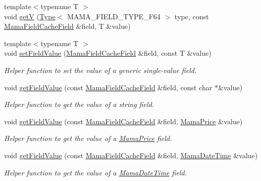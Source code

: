 \begin{DoxyCompactItemize}
\item 
{\footnotesize template$<$typename T $>$ }\\void \hyperlink{namespaceWombat_a3f1724eba9157b71bb956e9b5223c4d6}{getV} (\hyperlink{classWombat_1_1Type}{Type}$<$ MAMA\_\-FIELD\_\-TYPE\_\-F64 $>$ type, const \hyperlink{classWombat_1_1MamaFieldCacheField}{MamaFieldCacheField} \&field, T \&value)
\item 
{\footnotesize template$<$typename T $>$ }\\void \hyperlink{namespaceWombat_a94fa64d2a17b47d2a7b8aa81422ca29f}{setFieldValue} (\hyperlink{classWombat_1_1MamaFieldCacheField}{MamaFieldCacheField} \&field, const T \&value)
\begin{DoxyCompactList}\small\item\em Helper function to set the value of a generic single-\/value field. \item\end{DoxyCompactList}\item 
void \hyperlink{namespaceWombat_a1e9ea0e7b59e8d06e8e2a0ef9f93c45c}{getFieldValue} (const \hyperlink{classWombat_1_1MamaFieldCacheField}{MamaFieldCacheField} \&field, const char $\ast$\&value)
\begin{DoxyCompactList}\small\item\em Helper function to get the value of a string field. \item\end{DoxyCompactList}\item 
void \hyperlink{namespaceWombat_a021ef9dd6b39c33b35682320f76b7d32}{getFieldValue} (const \hyperlink{classWombat_1_1MamaFieldCacheField}{MamaFieldCacheField} \&field, \hyperlink{classWombat_1_1MamaPrice}{MamaPrice} \&value)
\begin{DoxyCompactList}\small\item\em Helper function to get the value of a \hyperlink{classWombat_1_1MamaPrice}{MamaPrice} field. \item\end{DoxyCompactList}\item 
void \hyperlink{namespaceWombat_a6031e1467e372e1cc764b8c40376dd20}{getFieldValue} (const \hyperlink{classWombat_1_1MamaFieldCacheField}{MamaFieldCacheField} \&field, \hyperlink{classWombat_1_1MamaDateTime}{MamaDateTime} \&value)
\begin{DoxyCompactList}\small\item\em Helper function to get the value of a \hyperlink{classWombat_1_1MamaDateTime}{MamaDateTime} field. \item\end{DoxyCompactList}\item 

\end{DoxyCompactItemize}
